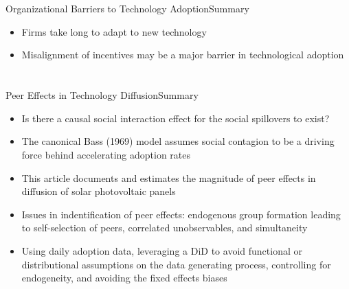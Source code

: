 \documentclass{beamer}
\begin{document}
\section{\cite{Teece1986}}
\begin{frame}{Organizational Barriers to Technology Adoption}{Summary}
\begin{itemize}
\item{Firms take long to adapt to new technology}
\item{Misalignment of incentives may be a major barrier in technological adoption}
\end{itemize}
\end{frame}



\section{\cite{Agrawal2014}}
\begin{frame}{Peer Effects in Technology Diffusion}{Summary}
\begin{itemize}
\item{Is there a causal social interaction effect for the social spillovers to exist?}
\item{The canonical Bass (1969) model assumes social contagion to be a driving force behind accelerating adoption rates}
\item{This article documents and estimates the magnitude of peer effects in diffusion of solar photovoltaic panels}
\item{Issues in indentification of peer effects: endogenous group formation leading to self-selection of peers, correlated unobservables, and simultaneity}
\item{Using daily adoption data, leveraging a DiD to avoid functional or distributional assumptions on the data generating process, controlling for endogeneity, and avoiding the fixed effects biases}
\end{itemize}
\end{frame}
\end{document}
